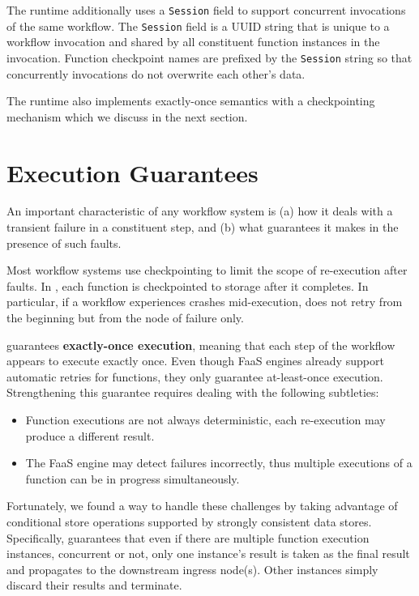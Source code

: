 The runtime additionally uses a \texttt{Session} field to support concurrent
invocations of the same workflow. The \texttt{Session} field is a UUID string
that is unique to a workflow invocation and shared by all constituent function
instances in the invocation. Function checkpoint names are prefixed by the
\texttt{Session} string so that concurrently invocations do not overwrite each
other's data.

The \name{} runtime also implements exactly-once semantics with a
checkpointing mechanism which we discuss in the next section.


\section{Execution Guarantees}

An important characteristic of any workflow system 
is (a) how it deals with  a transient failure in a constituent step, and 
(b) what guarantees it makes in the presence of such faults.
 
Most workflow systems use checkpointing to limit the scope of re-execution after faults. 
In \name{}, each function is checkpointed to storage after it completes. In particular, if a
workflow experiences crashes mid-execution, \name{} does not retry from the beginning but
from the node of failure only.

\name{} guarantees \textbf{exactly-once execution}, meaning that each step of the 
workflow appears to execute exactly once. Even though FaaS engines already support automatic retries for functions,
they only guarantee at-least-once execution. Strengthening this guarantee requires dealing with the following subtleties:
\begin{itemize}
\item Function executions are not always deterministic, each re-execution may produce a different result.
\item The FaaS engine may detect failures incorrectly, thus multiple executions of a function can be in progress simultaneously.
\end{itemize}

Fortunately, we found a way to handle these challenges by taking advantage of conditional store operations 
supported by strongly consistent data stores. 
Specifically, \name{} guarantees that even if there are
multiple function execution instances, concurrent or not, only one instance's result is
taken as the final result and propagates to the downstream ingress node(s).
Other instances simply discard their results and terminate. 

